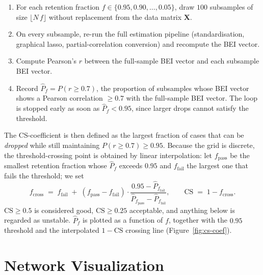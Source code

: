 \documentclass{article}
\begin{document}
\begin{enumerate}
    \item For each retention fraction
        $f \in \{0.95, 0.90, \dots, 0.05\}$, draw $100$ subsamples of
        size $\lfloor N\,f\rfloor$ without replacement from the data
        matrix $\mathbf{X}$.

    \item On every subsample, re-run the full estimation pipeline
        (standardisation, graphical lasso, partial-correlation
        conversion) and recompute the BEI vector.

    \item Compute Pearson's $r$ between the full-sample BEI vector and
        each subsample BEI vector.

    \item Record $\widehat{P}_f = P(r \geq 0.7)$, the proportion of
        subsamples whose BEI vector shows a Pearson correlation
        $\geq 0.7$ with the full-sample BEI vector. The loop is stopped
        early as soon as $\widehat{P}_f < 0.95$, since larger drops
        cannot satisfy the threshold.
\end{enumerate}

The CS-coefficient is then defined as the largest fraction of cases
that can be \emph{dropped} while still maintaining
$P(r \geq 0.7) \geq 0.95$. Because the grid is discrete, the
threshold-crossing point is obtained by linear interpolation: let
$f_{\text{pass}}$ be the smallest retention fraction whose
$\widehat{P}_f$ exceeds $0.95$ and $f_{\text{fail}}$ the largest one
that fails the threshold; we set
\[
    f_{\text{cross}} \;=\; f_{\text{fail}} \;+\;
    (f_{\text{pass}} - f_{\text{fail}}) \cdot
    \frac{0.95 - \widehat{P}_{f_{\text{fail}}}}
         {\widehat{P}_{f_{\text{pass}}} - \widehat{P}_{f_{\text{fail}}}},
    \qquad
    \mathrm{CS} \;=\; 1 - f_{\text{cross}}.
\]
$\mathrm{CS} \geq 0.5$ is considered good, $\mathrm{CS} \geq 0.25$
acceptable, and anything below is regarded as unstable. $\widehat{P}_f$ is plotted as a function of $f$, together with the $0.95$ threshold and the interpolated $1 - \mathrm{CS}$ crossing line (Figure~\ref{fig:cs-coef}).

\section{Network Visualization}
\end{document}
